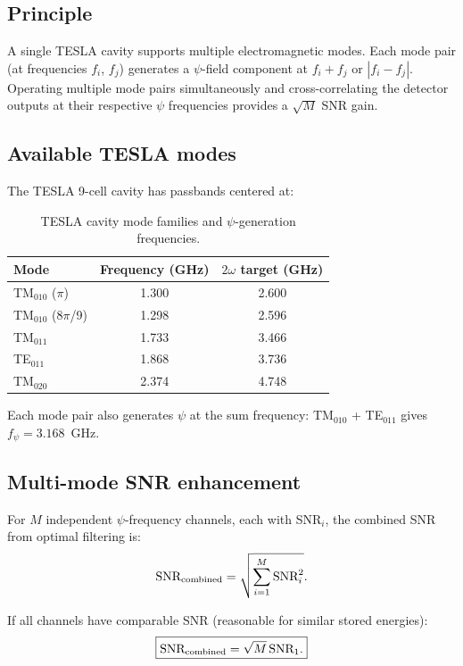 \documentclass[11pt]{article}
\begin{document}
\subsection{Principle}

A single TESLA cavity supports multiple electromagnetic modes.
Each mode pair (at frequencies $f_i$, $f_j$) generates a $\psi$-field
component at $f_i + f_j$ or $|f_i - f_j|$. Operating multiple
mode pairs simultaneously and cross-correlating the detector outputs
at their respective $\psi$ frequencies provides a $\sqrt{M}$ SNR gain.

\subsection{Available TESLA modes}

The TESLA 9-cell cavity has passbands centered at:
\begin{table}[H]
\centering
\caption{TESLA cavity mode families and $\psi$-generation frequencies.}
\begin{tabular}{lcc}
\toprule
Mode & Frequency (GHz) & $2\omega$ target (GHz) \\
\midrule
TM$_{010}$ ($\pi$) & 1.300 & 2.600 \\
TM$_{010}$ (8$\pi$/9) & 1.298 & 2.596 \\
TM$_{011}$ & 1.733 & 3.466 \\
TE$_{011}$ & 1.868 & 3.736 \\
TM$_{020}$ & 2.374 & 4.748 \\
\bottomrule
\end{tabular}
\end{table}

Each mode pair also generates $\psi$ at the sum frequency:
TM$_{010}$ + TE$_{011}$ gives $f_\psi = 3.168$~GHz.

\subsection{Multi-mode SNR enhancement}

For $M$ independent $\psi$-frequency channels, each with SNR$_i$,
the combined SNR from optimal filtering is:
\begin{equation}
\text{SNR}_{\rm combined} = \sqrt{\sum_{i=1}^M \text{SNR}_i^2}.
\end{equation}

If all channels have comparable SNR (reasonable for similar stored
energies):
\begin{equation}
\boxed{\text{SNR}_{\rm combined} = \sqrt{M}\,\text{SNR}_1.}
\end{equation}
\end{document}

